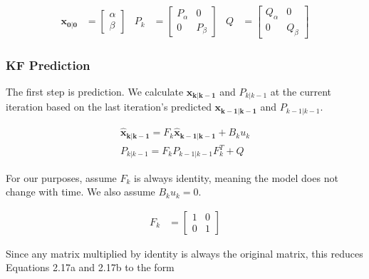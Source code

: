 \begin{subequations}
\begin{align}
    \bm{x_{0|0}} &= \begin{bmatrix}
           \alpha \\
           \beta
         \end{bmatrix}
 \end{align}
  \begin{align}
    P_{k} &= \begin{bmatrix}
           P_{\alpha}&0 \\
           0&P_{\beta}
         \end{bmatrix}
  \end{align}
  \begin{align}
    Q &= \begin{bmatrix}
        Q_{\alpha}&0 \\
        0&Q_{\beta}
        \end{bmatrix}
  \end{align}
  \end{subequations}
  
  \subsubsection{KF Prediction}
  
  The first step is prediction. We calculate $\bm{x_{k|k-1}}$ and $P_{k|k-1}$ at the current iteration based on the last iteration's predicted $\bm{x_{k-1|k-1}}$ and $P_{k-1|k-1}$.
  
  \begin{subequations}
  \begin{align}
  \bm{\hat{x}_{k|k-1}} = F_{k} \bm{\hat{x}_{k-1|k-1}}+B_{k}u_{k}   \\
  P_{k|k-1} = F_{k} P_{k-1|k-1}F_{k}^{T}+Q
  \end{align}
  \end{subequations}
  
  For our purposes, assume $F_{k}$ is always identity, meaning the model does not change with time. We also assume $B_{k}u_{k} = 0$.
  
  \begin{align}
    F_{k} &= \begin{bmatrix}
           1&0 \\
           0&1
         \end{bmatrix}
  \end{align}
  
  Since any matrix multiplied by identity is always the original matrix, this reduces Equations 2.17a and 2.17b to the form
  
